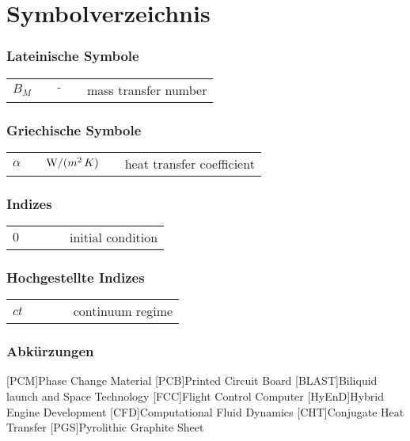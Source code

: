 \chapter*{Symbolverzeichnis}
	
\subsection*{Lateinische Symbole}

\begin{supertabular}{p{10mm}p{3mm}p{20mm}p{3mm}l}
$B_M$						& &	${\textrm - }$										&	&		mass transfer number\\
\end{supertabular}


\subsection*{Griechische Symbole}

\begin{supertabular}{p{10mm}p{3mm}p{20mm}p{3mm}l}
$\alpha$				& &	${\textrm W/(m^2\,K)}$					&	&		heat transfer coefficient\\
\end{supertabular} 


\subsection*{Indizes}

\begin{supertabular}{p{10mm}p{3mm}p{20mm}p{3mm}l}
$0$							& &																&	&		initial condition\\
\end{supertabular} 


\subsection*{Hochgestellte Indizes}

\begin{supertabular}{p{10mm}p{3mm}p{20mm}p{3mm}l}
$ct$						& &																&	&		continuum regime\\
\end{supertabular} 

\newpage

\subsection*{Abkürzungen}
\begin{acronym}[BLAST]
[PCM]{Phase Change Material}
[PCB]{Printed Circuit Board}
[BLAST]{Biliquid launch and Space Technology}
[FCC]{Flight Control Computer}
[HyEnD]{Hybrid Engine Development}
[CFD]{Computational Fluid Dynamics}
[CHT]{Conjugate Heat Transfer}
[PGS]{Pyrolithic Graphite Sheet}
\end{acronym}